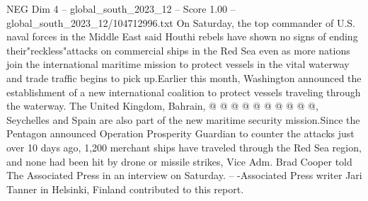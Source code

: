 \begin{textsample}{NEG Dim 4 – global\_south\_2023\_12 – Score 1.00 – global\_south\_2023\_12/104712996.txt}
On Saturday, the top commander of U.S. naval forces in the Middle East said Houthi rebels have shown no signs of ending their"reckless"attacks on commercial ships in the Red Sea even as more nations join the international maritime mission to protect vessels in the vital waterway and trade traffic begins to pick up.Earlier this month, Washington announced the establishment of a new international coalition to protect vessels traveling through the waterway.
The United Kingdom, Bahrain, @ @ @ @ @ @ @ @ @ @, Seychelles and Spain are also part of the new maritime security mission.Since the Pentagon announced Operation Prosperity Guardian to counter the attacks just over 10 days ago, 1,200 merchant ships have traveled through the Red Sea region, and none had been hit by drone or missile strikes, Vice Adm.
Brad Cooper told The Associated Press in an interview on Saturday. -- -Associated Press writer Jari Tanner in Helsinki, Finland contributed to this report.

\end{textsample}
